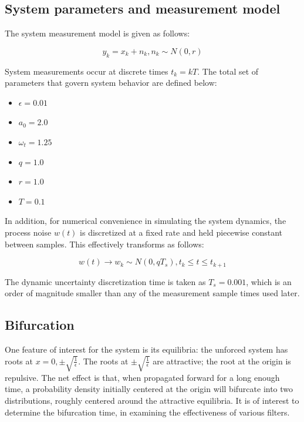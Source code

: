 \documentclass[]{article}
\begin{document}
\subsection{System parameters and measurement model}

The system measurement model is given as follows:

\begin{equation}
y_k = x_k + n_k, n_k \sim N(0,r)
\end{equation}

System measurements occur at discrete times $t_k = kT$. The total set of parameters that govern system behavior are defined below:

\begin{itemize}
\item $\epsilon = 0.01$
\item $a_0 = 2.0$
\item $\omega_t = 1.25$
\item $q = 1.0$
\item $r = 1.0$
\item $T = 0.1$
\end{itemize}

In addition, for numerical convenience in simulating the system dynamics, the process noise $w(t)$ is discretized at a fixed rate and held piecewise constant between samples. This effectively transforms as follows:

\begin{equation}
w(t) \rightarrow w_k \sim N(0,qT_s), t_k \leq t \leq t_{k+1}
\end{equation}

The dynamic uncertainty discretization time is taken as $T_s = 0.001$, which is an order of magnitude smaller than any of the measurement sample times used later.

\subsection{Bifurcation}

One feature of interest for the system is its equilibria: the unforced system has roots at $x = 0, \pm \sqrt{\frac{1}{\epsilon}}$. The roots at $\pm \sqrt{\frac{1}{\epsilon}}$ are attractive; the root at the origin is repulsive. The net effect is that, when propagated forward for a long enough time, a probability density initially centered at the origin will bifurcate into two distributions, roughly centered around the attractive equilibria. It is of interest to determine the bifurcation time, in examining the effectiveness of various filters.
\end{document}
